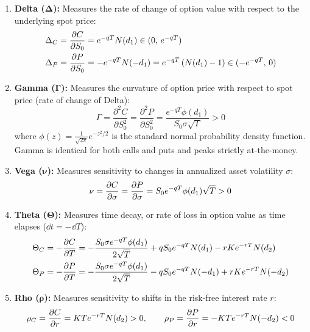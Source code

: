 \begin{enumerate}[leftmargin=1.5em, itemsep=1pt, parsep=0pt, label=\textbf{\arabic*.}]
    \item \textbf{Delta ($\bm{\Delta}$):} Measures the rate of change of option value with respect to the underlying spot price:
    \begin{align}
        \Delta_C &= \frac{\partial C}{\partial S_0} = e^{-qT} N(d_1) \in (0, \, e^{-qT}) \label{eq:delta_call} \\
        \Delta_P &= \frac{\partial P}{\partial S_0} = -e^{-qT} N(-d_1) = e^{-qT} \left( N(d_1) - 1 \right) \in (-e^{-qT}, \, 0) \label{eq:delta_put}
    \end{align}
    \item \textbf{Gamma ($\bm{\Gamma}$):} Measures the curvature of option price with respect to spot price (rate of change of Delta):
    \begin{equation}
        \Gamma = \frac{\partial^2 C}{\partial S_0^2} = \frac{\partial^2 P}{\partial S_0^2} = \frac{e^{-qT} \phi(d_1)}{S_0 \sigma \sqrt{T}} > 0
        \label{eq:gamma}
    \end{equation}
    where $\phi(z) = \frac{1}{\sqrt{2\pi}} e^{-z^2/2}$ is the standard normal probability density function. Gamma is identical for both calls and puts and peaks strictly at-the-money.
    \item \textbf{Vega ($\bm{\nu}$):} Measures sensitivity to changes in annualized asset volatility $\sigma$:
    \begin{equation}
        \nu = \frac{\partial C}{\partial \sigma} = \frac{\partial P}{\partial \sigma} = S_0 e^{-qT} \phi(d_1) \sqrt{T} > 0
        \label{eq:vega}
    \end{equation}
    \item \textbf{Theta ($\bm{\Theta}$):} Measures time decay, or rate of loss in option value as time elapses ($\dd t = -\dd T$):
    \begin{align}
        \Theta_C &= -\frac{\partial C}{\partial T} = -\frac{S_0 \sigma e^{-qT} \phi(d_1)}{2\sqrt{T}} + q S_0 e^{-qT} N(d_1) - r K e^{-rT} N(d_2) \label{eq:theta_call} \\
        \Theta_P &= -\frac{\partial P}{\partial T} = -\frac{S_0 \sigma e^{-qT} \phi(d_1)}{2\sqrt{T}} - q S_0 e^{-qT} N(-d_1) + r K e^{-rT} N(-d_2) \label{eq:theta_put}
    \end{align}
    \item \textbf{Rho ($\bm{\rho}$):} Measures sensitivity to shifts in the risk-free interest rate $r$:
    \begin{equation}
        \rho_C = \frac{\partial C}{\partial r} = K T e^{-rT} N(d_2) > 0, \qquad \rho_P = \frac{\partial P}{\partial r} = -K T e^{-rT} N(-d_2) < 0
        \label{eq:rho}
    \end{equation}
\end{enumerate}


